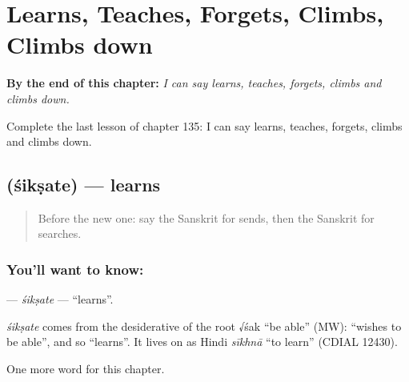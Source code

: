 
\chapter{Learns, Teaches, Forgets, Climbs, Climbs down}
\label{ch:sa-learns-teaches-forgets-climbs-climbs-down}

\begin{chapteropening}
\textbf{By the end of this chapter:} \emph{I can say learns, teaches, forgets, climbs and climbs down.}

Complete the last lesson of chapter 135: I can say learns, teaches, forgets, climbs and climbs down.
\end{chapteropening}

\section[\texorpdfstring{\sk{शिक्षते} (śikṣate)}{शिक्षते (śikṣate)}]{ (śikṣate) — learns}

\label{lesson:SA-C135-siksate}



\begin{quote}
Before the new one: say the Sanskrit for sends, then the Sanskrit for searches.
\end{quote}

\subsection*{You'll want to know: }
\textbf{} — \emph{śikṣate} — \textquotedblleft{}learns\textquotedblright{}.

\begin{cousinweb}
\emph{śikṣate} comes from the desiderative of the root √śak \textquotedblleft{}be able\textquotedblright{} (MW): \textquotedblleft{}wishes to be able\textquotedblright{}, and so \textquotedblleft{}learns\textquotedblright{}. It lives on as Hindi \emph{sīkhnā} \textquotedblleft{}to learn\textquotedblright{} (CDIAL 12430).
\end{cousinweb}

\begin{grammarlens}[title={What you've built}]
One more word for this chapter.
\end{grammarlens}


